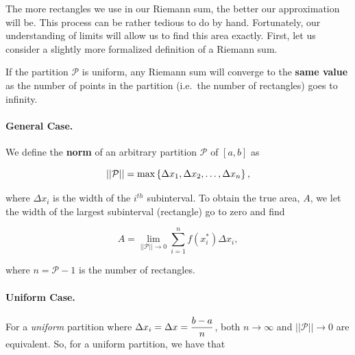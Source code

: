 \documentclass[12pt]{article}
\begin{document}
\newpage

The more rectangles we use in our Riemann sum, the better our approximation will be. This process can be rather tedious to do by hand. Fortunately, our understanding of limits will allow us to find this area exactly. First, let us consider a slightly more formalized definition of a Riemann sum.

\vspace{3mm}


\vspace{5mm}

If the partition $\mathcal{P}$ is uniform, any Riemann sum will converge to the \textbf{same value} as the number of points in the partition (i.e.\ the number of rectangles) goes to infinity.

\vspace{5mm}

\paragraph{General Case.} We define the \textbf{norm} of an arbitrary partition $\mathcal{P}$ of $[a,b]$ as

$$||\mathcal{P}||=\text{max}\left\{\Delta x_1,\Delta x_2,\dots,\Delta x_n\right\},$$

\vspace{3mm}

where $\Delta x_i$ is the width of the $i^{th}$ subinterval. To obtain the true area, $A$, we let the width of the largest subinterval (rectangle) go to zero and find 

$$A=\lim_{||\mathcal{P}||\to 0}\sum_{i=1}^n f(x_i^*)\Delta x_i,$$

\vspace{3mm}

where $n=\mathcal{P}-1$ is the number of rectangles.

\vspace{5mm}

\paragraph{Uniform Case.} For a \textit{uniform} partition where $\Delta x_i=\Delta x=\displaystyle\frac{b-a}{n}$, both $n\to\infty$ and $||\mathcal{P}||\to 0$ are equivalent. So, for a uniform partition, we have that
\end{document}
